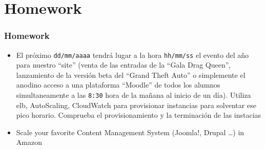 \documentclass{beamer}
\begin{document}
\section{Homework}
\begin{frame}[fragile]
\frametitle{Homework}
\begin{itemize}
\item El próximo \texttt{dd/mm/aaaa} tendrá lugar a la hora \texttt{hh/mm/ss} el evento del año para nuestro ``site'' (venta de las entradas de la
``Gala Drag Queen'', lanzamiento de la versión beta del ``Grand Theft Auto'' o simplemente el anodino acceso a una plataforma ``Moodle'' de todos los alumnos simultaneamente a las \texttt{8:30} hora de la mañana al inicio de un día). 
Utiliza \acrshort{elb}, AutoScaling, CloudWatch para provisionar instancias para solventar ese pico horario. Comprueba el provisionamiento y la terminación de las instacias

\item Scale your favorite Content Management System (Joomla!, Drupal \dots) in Amazon
\end{itemize}
\end{frame}
\end{document}
